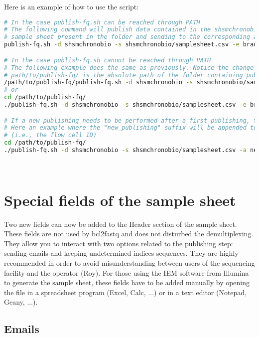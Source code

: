 \documentclass[11pt]{report}
\begin{document}
Here is an example of how to use the script:
\begin{lstlisting}[language=bash]
# In the case publish-fq.sh can be reached through PATH
# The following command will publish data contained in the shsmchronobio using the
# sample sheet present in the folder and sending to the corresponding author
publish-fq.sh -d shsmchronobio -s shsmchronobio/samplesheet.csv -e brad

# In the case publish-fq.sh cannot be reached through PATH
# The following example does the same as previously. Notice the change at the beginning:
# path/to/publish-fq/ is the absolute path of the folder containing publish-fq.sh
/path/to/publish-fq/publish-fq.sh -d shsmchronobio -s shsmchronobio/samplesheet.csv -e brad
# or
cd /path/to/publish-fq/
./publish-fq.sh -d shsmchronobio -s shsmchronobio/samplesheet.csv -e brad

# If a new publishing needs to be performed after a first publishing, this option -a must be used.
# Here an example where the "new_publishing" suffix will be appended to the directory name
# (i.e., the flow cell ID)
cd /path/to/publish-fq/
./publish-fq.sh -d shsmchronobio -s shsmchronobio/samplesheet.csv -a new_publishing -e brad
\end{lstlisting}
~\\


 \chapter*{Special fields of the sample sheet}
\setcounter{section}{0}

Two new fields can now be added to the Header section of the sample sheet. These fields are not used by bcl2fastq and does not disturbed the demultiplexing. They allow you to interact with two options related to the publishing step: sending emails and keeping undetermined indices sequences. They are highly recommended in order to avoid misunderstanding between users of the sequencing facility and the operator (Roy). For those using the IEM software from Illumina to generate the sample sheet, these fields have to be added manually by opening the file in a spreadsheet program (Excel, Calc, ...) or in a text editor (Notepad, Geany, ...).

 \section{Emails}
\end{document}
